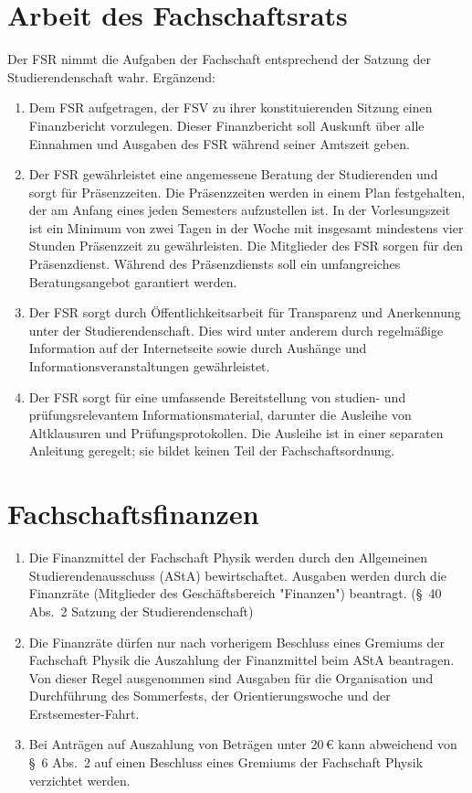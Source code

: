 \section{Arbeit des Fachschaftsrats}
Der FSR nimmt die Aufgaben der Fachschaft entsprechend der Satzung der Studierendenschaft wahr.
Ergänzend:
\begin{enumerate}
	\item Dem FSR aufgetragen, der FSV zu ihrer konstituierenden Sitzung einen Finanzbericht vorzulegen.
	Dieser Finanzbericht soll Auskunft über alle Einnahmen und Ausgaben des FSR während seiner Amtszeit geben.
	\item Der FSR gewährleistet eine angemessene Beratung der Studierenden und sorgt für Präsenzzeiten.
	Die Präsenzzeiten werden in einem Plan festgehalten, der am Anfang eines jeden Semesters aufzustellen ist.
	In der Vorlesungszeit ist ein Minimum von zwei Tagen in der Woche mit insgesamt mindestens vier Stunden Präsenzzeit zu gewährleisten.
	Die Mitglieder des FSR sorgen für den Präsenzdienst.
	Während des Präsenzdiensts soll ein umfangreiches Beratungsangebot garantiert werden.
	\item Der FSR sorgt durch Öffentlichkeitsarbeit für Transparenz und Anerkennung unter der Studierendenschaft.
	Dies wird unter anderem durch regelmäßige Information auf der Internetseite sowie durch Aushänge und Informationsveranstaltungen gewährleistet.
	\item Der FSR sorgt für eine umfassende Bereitstellung von studien- und prüfungsrelevantem Informationsmaterial, darunter die Ausleihe von Altklausuren und Prüfungsprotokollen.
	Die Ausleihe ist in einer separaten Anleitung geregelt; sie bildet keinen Teil der Fachschaftsordnung.
\end{enumerate}

\section{Fachschaftsfinanzen}
\begin{enumerate}
	\item Die Finanzmittel der Fachschaft Physik werden durch den Allgemeinen Studierendenausschuss (AStA) bewirtschaftet.
	Ausgaben werden durch die Finanzräte (Mitglieder des Geschäftsbereich "Finanzen") beantragt.
	(§~40 Abs.~2 Satzung der Studierendenschaft)
	\item Die Finanzräte dürfen nur nach vorherigem Beschluss eines Gremiums der Fachschaft Physik die Auszahlung der Finanzmittel beim AStA beantragen.
	Von dieser Regel ausgenommen sind Ausgaben für die Organisation und Durchführung des Sommerfests, der Orientierungswoche und der Erstsemester-Fahrt.
	\item Bei Anträgen auf Auszahlung von Beträgen unter 20\,€ kann abweichend von §~6 Abs.~2 auf einen Beschluss eines Gremiums der Fachschaft Physik verzichtet werden.
\end{enumerate}

